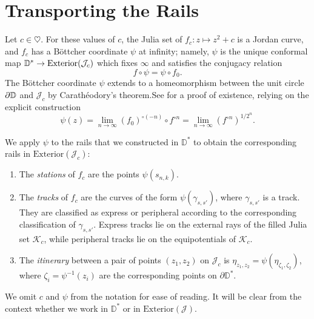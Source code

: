 \section{Transporting the Rails} \label{rails-section}
Let $c\in \heartsuit$. For these values of $c$, the Julia set of $f_c: z\mapsto z^2+c$ is a Jordan curve, and $f_c$ has 
a Böttcher coordinate $\psi$ at infinity; 
namely, $\psi$ is the unique conformal map $\mathbb{D}^{*}\to\mathrm{Exterior}(\mathcal{J}_c)$  which fixes $\infty$ and satisfies the conjugacy relation 
$$
f\circ\psi=\psi\circ f_{0}.
$$
The Böttcher coordinate $\psi$ extends to a homeomorphism between the unit circle $\partial\mathbb{D}$ and $\mathcal{J}_c$ by Carathéodory's
theorem.See \cite[Theorem 9.5]{milnor_book} for a proof of existence, 
relying on the explicit construction 
\begin{equation}
	\psi(z)=\lim_{n\to \infty} (f_0)^{\circ (-n)} \circ f^{\circ n}=\lim_{n\to \infty} {(f^{\circ n})}^{1/2^n}.	
\end{equation}




We apply $\psi$ to the rails that we constructed in $\mathbb D^*$ 
to obtain the corresponding rails in $\mathrm{Exterior}(\mathcal{J}_c)$:
\begin{definition} \leavevmode
\begin{enumerate}
	\item The 	\emph{stations} of $f_c$ are the points $\psi(s_{n,k})$.


\item The \emph{tracks} of $f_c$ are the curves of the form $\psi \left(\gamma_{s,s'}\right)$, where $\gamma_{s,s'}$ is a track. They are classified as express or peripheral according to the corresponding classification of $\gamma_{s,s'}$. 
Express tracks lie on the external rays of the filled Julia set $\mathcal K_c$, while peripheral tracks lie on the equipotentials of $\mathcal K_c$.

\item The \emph{itinerary} between a pair of points $(z_1,z_2)$ on $\mathcal J_c$ is
$\eta_{z_1,z_2}=\psi(\eta_{\zeta_1,\zeta_2})$, 
where $\zeta_i=\psi^{-1}(z_i)$ are the corresponding points on $\partial \mathbb D^*$. 
\end{enumerate}

We omit $c$ and $\psi$ from the notation for ease of reading. It will be clear from the context whether we work in $\mathbb D^*$ or in $\mathrm{Exterior}(\mathcal J)$.

\end{definition}

